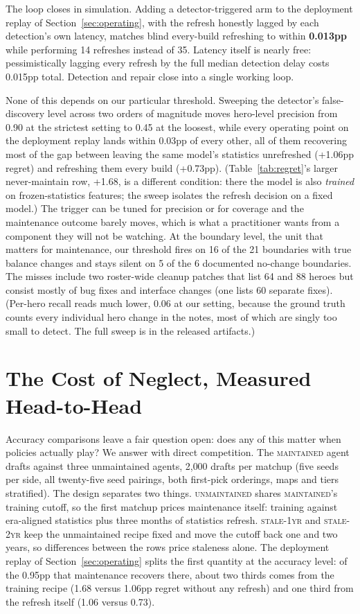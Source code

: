 \documentclass[journal]{IEEEtran}
\newcommand{\maintained}{\textsc{maintained}}          %
\newcommand{\stalefour}{\textsc{unmaintained}}
\newcommand{\staleone}{\textsc{stale-1yr}}
\newcommand{\staletwo}{\textsc{stale-2yr}}
\begin{document}
The loop closes in simulation. Adding a detector-triggered arm to the
deployment replay of Section~\ref{sec:operating}, with the refresh
honestly lagged by each detection's own latency, matches blind
every-build refreshing to within \textbf{0.013pp} while performing 14
refreshes instead of 35. Latency itself is nearly free: pessimistically
lagging every refresh by the full median detection delay costs 0.015pp
total. Detection and repair close into a single working loop.

None of this depends on our particular threshold. Sweeping the
detector's false-discovery level across two orders of magnitude moves
hero-level precision from 0.90 at the strictest setting to 0.45 at the
loosest,
while every operating point on the deployment replay lands within
0.03pp of every other, all of them recovering most of the gap between
leaving the same model's statistics unrefreshed (+1.06pp regret) and
refreshing them every build (+0.73pp). (Table~\ref{tab:regret}'s larger
never-maintain row, +1.68, is a different condition: there the model is
also \emph{trained} on frozen-statistics features; the sweep isolates
the refresh decision on a fixed model.) The trigger can be tuned for
precision or for coverage and the maintenance outcome barely moves,
which is what a practitioner wants from a component they will not be
watching. At the boundary level, the unit that matters for maintenance,
our threshold fires on 16 of the 21 boundaries with true balance
changes and stays silent on 5 of the 6 documented no-change boundaries.
The misses include two roster-wide cleanup patches that list 64 and 88
heroes but consist mostly of bug fixes and interface changes (one lists
60 separate fixes).
(Per-hero recall reads much lower, 0.06 at our setting, because the
ground truth counts every individual hero change in the notes, most of
which are singly too small to detect. The full sweep is in the released
artifacts.)

\section{The Cost of Neglect, Measured Head-to-Head}
\label{sec:neglect}

Accuracy comparisons leave a fair question open: does any of this matter
when policies actually play? We answer with direct competition. The
\maintained{} agent drafts against three unmaintained agents, 2{,}000
drafts per matchup (five seeds per side, all twenty-five seed pairings,
both first-pick orderings, maps and tiers stratified). The design
separates two things. \stalefour{} shares \maintained{}'s training
cutoff, so the first matchup prices maintenance itself: training against
era-aligned statistics plus three months of statistics refresh.
\staleone{} and \staletwo{} keep the unmaintained recipe fixed and move
the cutoff back one and two years, so differences between the rows
price staleness alone. The deployment replay of
Section~\ref{sec:operating} splits the first quantity at the accuracy
level: of the 0.95pp that maintenance recovers there, about two thirds
comes from the training recipe (1.68 versus 1.06pp regret without any
refresh) and one third from the refresh itself (1.06 versus 0.73).
\end{document}
